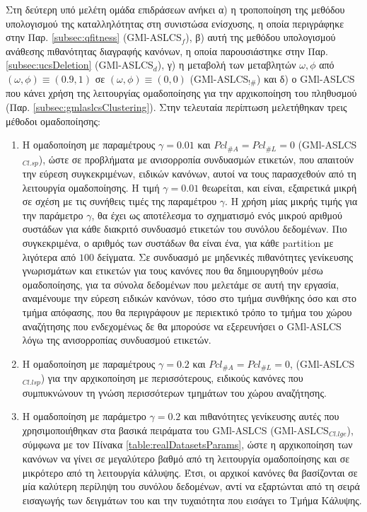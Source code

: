Στη δεύτερη υπό μελέτη ομάδα επιδράσεων ανήκει α) η τροποποίηση της μεθόδου υπολογισμού της καταλληλότητας στη συνιστώσα ενίσχυσης, η οποία περιγράφηκε στην Παρ. \ref{subsec:qfitness} (GMl-ASLCS$_{f}$),  β) αυτή της μεθόδου υπολογισμού ανάθεσης πιθανότητας διαγραφής κανόνων, η οποία παρουσιάστηκε στην Παρ. \ref{subsec:ucsDeletion} (GMl-ASLCS$_{d}$), γ) η μεταβολή των μεταβλητών $\omega, \phi$ από $(\omega, \phi) \equiv (0.9,1)$ σε $(\omega, \phi) \equiv (0,0)$ (GMl-ASLCS$_{!\#}$) και δ) ο GMl-ASLCS που κάνει χρήση της λειτουργίας ομαδοποίησης για την αρχικοποίηση του πληθυσμού (Παρ. \ref{subsec:gmlaslcsClustering}). Στην τελευταία περίπτωση μελετήθηκαν τρεις μέθοδοι ομαδοποίησης: 
\begin{enumerate}
\item Η ομαδοποίηση με παραμέτρους $\gamma=0.01$ και $Pcl_{\#A}=Pcl_{\#L}=0$ (GMl-ASLCS$_{Cl.sp}$), ώστε σε προβλήματα με ανισορροπία συνδυασμών ετικετών, που απαιτούν την εύρεση συγκεκριμένων, ειδικών κανόνων, αυτοί να τους παρασχεθούν από τη λειτουργία ομαδοποίησης. Η τιμή $\gamma=0.01$ θεωρείται, και είναι, εξαιρετικά μικρή σε σχέση με τις συνήθεις τιμές της παραμέτρου $\gamma$. Η χρήση μίας μικρής τιμής για την παράμετρο $\gamma$, θα έχει ως αποτέλεσμα το σχηματισμό ενός μικρού αριθμού συστάδων για κάθε διακριτό συνδυασμό ετικετών του συνόλου δεδομένων. Πιο συγκεκριμένα, ο αριθμός των συστάδων θα είναι ένα, για κάθε partition με λιγότερα από $100$ δείγματα. Σε συνδυασμό με μηδενικές πιθανότητες γενίκευσης γνωρισμάτων και ετικετών για τους κανόνες που θα δημιουργηθούν μέσω ομαδοποίησης, για τα σύνολα δεδομένων που μελετάμε σε αυτή την εργασία, αναμένουμε την εύρεση ειδικών κανόνων, τόσο στο τμήμα συνθήκης όσο και στο τμήμα απόφασης, που θα περιγράφουν με περιεκτικό τρόπο το τμήμα του χώρου αναζήτησης που ενδεχομένως δε θα μπορούσε να εξερευνήσει ο GMl-ASLCS λόγω της ανισορροπίας συνδυασμού ετικετών.

\item Η ομαδοποίηση με παραμέτρους $\gamma=0.2$ και $Pcl_{\#A}=Pcl_{\#L}=0$, (GMl-ASLCS$_{Cl.lsp}$) για την αρχικοποίηση με περισσότερους, ειδικούς κανόνες που συμπυκνώνουν τη γνώση περισσότερων τμημάτων του χώρου αναζήτησης.

\item Η ομαδοποίηση με παράμετρο $\gamma=0.2$ και πιθανότητες γενίκευσης αυτές που χρησιμοποιήθηκαν στα βασικά πειράματα του GMl-ASLCS (GMl-ASLCS$_{Cl.lge}$), σύμφωνα με τον Πίνακα \ref{table:realDatasetsParams}, ώστε η αρχικοποίηση των κανόνων να γίνει σε μεγαλύτερο βαθμό από τη λειτουργία ομαδοποίησης και σε μικρότερο από τη λειτουργία κάλυψης. Έτσι, οι αρχικοί κανόνες θα βασίζονται σε μία καλύτερη περίληψη του συνόλου δεδομένων, αντί να εξαρτώνται από τη σειρά εισαγωγής των δειγμάτων του και την τυχαιότητα που εισάγει το Τμήμα Κάλυψης.
\end{enumerate}

